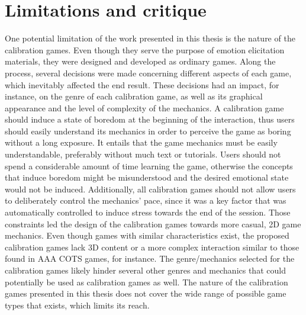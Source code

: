 \chapter{Limitations and critique}
\label{ch:limitations}

One potential limitation of the work presented in this thesis is the nature of the calibration games. Even though they serve the purpose of emotion elicitation materials, they were designed and developed as ordinary games. Along the process, several decisions were made concerning different aspects of each game, which inevitably affected the end result. These decisions had an impact, for instance, on the genre of each calibration game, as well as its graphical appearance and the level of complexity of the mechanics. A calibration game should induce a state of boredom at the beginning of the interaction, thus users should easily understand its mechanics in order to perceive the game as boring without a long exposure. It entails that the game mechanics must be easily understandable, preferably without much text or tutorials. Users should not spend a considerable amount of time learning the game, otherwise the concepts that induce boredom might be misunderstood and the desired emotional state would not be induced. Additionally, all calibration games should not allow users to deliberately control the mechanics' pace, since it was a key factor that was automatically controlled to induce stress towards the end of the session. Those constraints led the design of the calibration games towards more casual, 2D game mechanics. Even though games with similar characteristics exist, the proposed calibration games lack 3D content or a more complex interaction similar to those found in AAA COTS games, for instance. The genre/mechanics selected for the calibration games likely hinder several other genres and mechanics that could potentially be used as calibration games as well. The nature of the calibration games presented in this thesis does not cover the wide range of possible game types that exists, which limits its reach.

